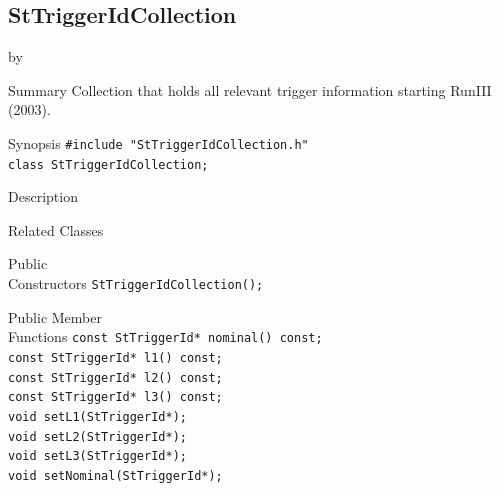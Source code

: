 \documentclass[twoside]{article}
\newcommand{\entrylabel}[1]{\mbox{\textbf{{#1}}}\hfil}%
\newenvironment{entry}
{\begin{list}{}%
    {\renewcommand{\makelabel}{\entrylabel}%
     \setlength{\labelwidth}{90pt}%
     \setlength{\leftmargin}{\labelwidth}
     \advance\leftmargin by \labelsep%
      }%
    }%
  {\end{list}}
\newcommand{\Entrylabel}[1]%
{\raisebox{0pt}[1ex][0pt]{\makebox[\labelwidth][l]%
    {\parbox[t]{\labelwidth}{\hspace{0pt}\textbf{{#1}}}}}}
\newenvironment{Entry}%
{\renewcommand{\entrylabel}{\Entrylabel}\begin{entry}}%
  {\end{entry}}
\begin{document}
\subsection{StTriggerIdCollection}
\label{sec:StTriggerIdCollection}
\begin{Entry}
\item[Summary] Collection that holds all relevant trigger information starting RunIII (2003).
\item[Synopsis]
    \verb+#include "StTriggerIdCollection.h"+\\
    \verb+class StTriggerIdCollection;+\\
\item[Description]
\item[Related Classes]
\item[Public\\ Constructors]
    \verb+StTriggerIdCollection();+\\
\item[Public Member\\ Functions]
    \verb+const StTriggerId* nominal() const;+\\
    \verb+const StTriggerId* l1() const;+\\
    \verb+const StTriggerId* l2() const;+\\
    \verb+const StTriggerId* l3() const;+\\
    
    \verb+void setL1(StTriggerId*);+\\
    \verb+void setL2(StTriggerId*);+\\
    \verb+void setL3(StTriggerId*);+\\
    \verb+void setNominal(StTriggerId*);+\\
\end{Entry}
\clearpage
\end{document}
